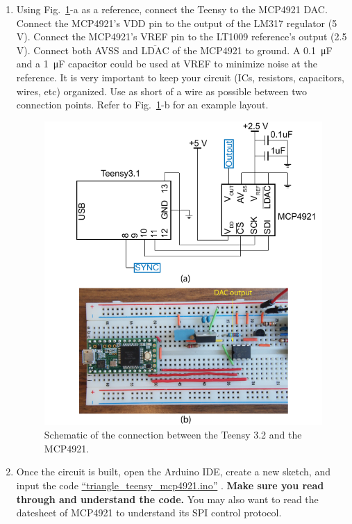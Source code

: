 \documentclass[letterpaper, 11pt]{article}
\begin{document}
\begin{enumerate}
	\item Using Fig.~\ref{fig:dac-sch}-a as a reference, connect the Teensy to the MCP4921 DAC. Connect the MCP4921's VDD pin to the output of the LM317 regulator (5\,V). Connect the MCP4921's VREF pin to the LT1009 reference's output (2.5\,V). Connect both AVSS and $\overline{\text{LDAC}}$ of the MCP4921 to ground. A \SI{0.1}{\micro\farad} and a \SI{1}{\micro\farad} capacitor could be used at VREF to minimize noise at the reference. It is very important to keep your circuit (ICs, resistors, capacitors, wires, etc) organized. Use as short of a wire as possible between two connection points. Refer to Fig.~\ref{fig:dac-sch}-b for an example layout.
	
	\begin{figure}[h]
		\centering
		\includegraphics{dac-sch}
		\caption{Schematic of the connection between the Teensy 3.2 and the MCP4921.}
		\label{fig:dac-sch}
	\end{figure}

\item Once the circuit is built, open the Arduino IDE, create a new sketch, and input the code \href{https://github.com/ucdart/UCD-EEC134/blob/master/labs/lab1/code/triangle_teensy_mcp4921/triangle_teensy_mcp4921.ino}{``triangle\_teensy\_mcp4921.ino''} . \textbf{Make sure you read through and understand the code.} You may also want to read the datesheet of MCP4921 to understand its SPI control protocol. 


\end{enumerate}
\end{document}
